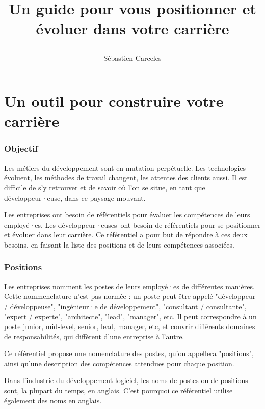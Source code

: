 \documentclass[a4paper, french, openany, 12pt]{book}
\title{
  \vspace*{-8cm}

  \fullwidthimage{images/cover.jpg}

  \vspace*{5cm}

  \bsc{Référenciel de compétences pour développeurs et développeuses}

  Un guide pour vous positionner et évoluer dans votre carrière
}
\author{Sébastien Carceles}
\date{}
\newcommand\dev{développeur·euse}
\newcommand\devs{développeur·euses}
\begin{document}
\begin{titlepage}
  \maketitle
\end{titlepage}

\mainmatter

\part{Un outil pour construire  votre carrière}

\begin{multicols}{2}
  
  \section*{Objectif}
  
  Les métiers du développement sont en mutation perpétuelle.
  Les technologies évoluent, les méthodes de travail changent, les attentes des clients aussi.
  Il est difficile de s'y retrouver et de savoir où l'on se situe, en tant que \dev, dans ce paysage mouvant.
  
  Les entreprises ont besoin de référentiels pour évaluer les compétences de leurs employé·es.
  Les \devs\ ont besoin de référentiels pour se positionner et évoluer dans leur carrière.
  Ce référentiel a pour but de répondre à ces deux besoins, en faisant la liste des positions et de leurs compétences
  associées.
  
  \section*{Positions}
  
  Les entreprises nomment les postes de leurs employé·es de différentes manières.
  Cette nommenclature n'est pas normée : un poste peut être appelé "développeur / développeuse", "ingénieur·e de 
  développement", "consultant / consultante", "expert / experte", "architecte", "lead", "manager", etc.
  Il peut correspondre à un poste junior, mid-level, senior, lead, manager, etc, et couvrir différents domaines de 
  responsabilités, qui diffèrent d'une entreprise à l'autre.
  
  Ce référentiel propose une nomenclature des postes, qu'on appellera "positions",
  ainsi qu'une description des compétences attendues pour chaque position.
  
  Dans l'industrie du développement logiciel, les noms de postes ou de positions sont, la plupart du temps, en anglais.
  C'est pourquoi ce référentiel utilise également des noms en anglais.


\end{multicols}
\end{document}
